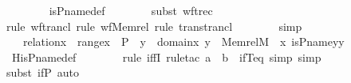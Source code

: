 \begin{isabellebody}
\ \ \ \ \ \ \isamarkupfalse%
\ is{\isacharunderscore}{\kern0pt}P{\isacharunderscore}{\kern0pt}name{\isacharunderscore}{\kern0pt}def\ \isanewline
\ \ \ \ \ \ \isamarkupfalse%
{\isacharparenleft}{\kern0pt}subst\ wftrec{\isacharparenright}{\kern0pt}\isanewline
\ \ \ \ \ \ \ \ \isamarkupfalse%
{\isacharparenleft}{\kern0pt}rule\ wf{\isacharunderscore}{\kern0pt}trancl{\isacharcomma}{\kern0pt}\ rule\ wf{\isacharunderscore}{\kern0pt}Memrel{\isacharcomma}{\kern0pt}\ rule\ trans{\isacharunderscore}{\kern0pt}trancl{\isacharparenright}{\kern0pt}\isanewline
\ \ \ \ \ \ \isamarkupfalse%
\ simp\isanewline
\ \ \ \ \isamarkupfalse%
\ \isamarkupfalse%
\ {\isachardoublequoteopen}{\isachardot}{\kern0pt}{\isachardot}{\kern0pt}{\isachardot}{\kern0pt}\ {\isasymlongleftrightarrow}\ relation{\isacharparenleft}{\kern0pt}x{\isacharparenright}{\kern0pt}\ {\isasymand}\ range{\isacharparenleft}{\kern0pt}x{\isacharparenright}{\kern0pt}\ {\isasymsubseteq}\ P\ {\isasymand}\ {\isacharparenleft}{\kern0pt}{\isasymforall}y\ {\isasymin}\ domain{\isacharparenleft}{\kern0pt}x{\isacharparenright}{\kern0pt}{\isachardot}{\kern0pt}\ {\isacharparenleft}{\kern0pt}{\isasymlambda}y\ {\isasymin}\ Memrel{\isacharparenleft}{\kern0pt}M{\isacharparenright}{\kern0pt}{\isacharcircum}{\kern0pt}{\isacharplus}{\kern0pt}\ {\isacharminus}{\kern0pt}{\isacharbackquote}{\kern0pt}{\isacharbackquote}{\kern0pt}\ {\isacharbraceleft}{\kern0pt}x{\isacharbraceright}{\kern0pt}{\isachardot}{\kern0pt}\ is{\isacharunderscore}{\kern0pt}P{\isacharunderscore}{\kern0pt}name{\isacharparenleft}{\kern0pt}y{\isacharparenright}{\kern0pt}{\isacharparenright}{\kern0pt}{\isacharbackquote}{\kern0pt}y\ {\isacharequal}{\kern0pt}\ {}{\isacharparenright}{\kern0pt}{\isachardoublequoteclose}\ \isanewline
\ \ \ \ \ \ \isamarkupfalse%
\ His{\isacharunderscore}{\kern0pt}P{\isacharunderscore}{\kern0pt}name{\isacharunderscore}{\kern0pt}def\ \isanewline
\ \ \ \ \ \ \isamarkupfalse%
{\isacharparenleft}{\kern0pt}rule\ iffI{\isacharcomma}{\kern0pt}\ rule{\isacharunderscore}{\kern0pt}tac\ a{\isacharequal}{\kern0pt}{}\ \ b{\isacharequal}{\kern0pt}{}\ \ ifT{\isacharunderscore}{\kern0pt}eq{\isacharcomma}{\kern0pt}\ simp{\isacharcomma}{\kern0pt}\ simp{\isacharparenright}{\kern0pt}\isanewline
\ \ \ \ \ \ \isamarkupfalse%
{\isacharparenleft}{\kern0pt}subst\ if{\isacharunderscore}{\kern0pt}P{\isacharcomma}{\kern0pt}\ auto{\isacharparenright}{\kern0pt}\isanewline

\end{isabellebody}

